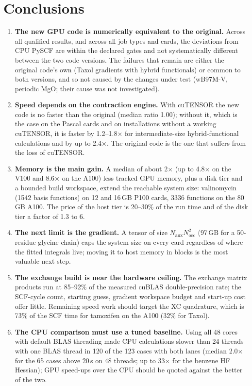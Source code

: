 \section{Conclusions}
\label{sec:conclusions}

\begin{enumerate}[itemsep=2pt]
\item \textbf{The new GPU code is numerically equivalent to the original.} Across all qualified results, and across all job types and cards, the deviations from CPU PySCF are within the declared gates and not systematically different between the two code versions. The failures that remain are either the original code's own (Taxol gradients with hybrid functionals) or common to both versions, and so not caused by the changes under test (wB97M-V, periodic MgO; their cause was not investigated).
\item \textbf{Speed depends on the contraction engine.} With cuTENSOR the new code is no faster than the original (median ratio 1.00); without it, which is the case on the Pascal cards and on installations without a working cuTENSOR, it is faster by 1.2--1.8$\times$ for intermediate-size hybrid-functional calculations and by up to 2.4$\times$. The original code is the one that suffers from the loss of cuTENSOR.
\item \textbf{Memory is the main gain.} A median of about 2$\times$ (up to 4.8$\times$ on the V100 and 8.6$\times$ on the A100) less tracked GPU memory, plus a disk tier and a bounded build workspace, extend the reachable system size: valinomycin (1542 basis functions) on 12 and 16\,GB P100 cards, 3336 functions on the 80\,GB A100. The price of the host tier is 20--30\% of the run time and of the disk tier a factor of 1.3 to 6.
\item \textbf{The next limit is the gradient.} A tensor of size $N_\mathrm{aux}N_\mathrm{occ}^2$ (97\,GB for a 50-residue glycine chain) caps the system size on every card regardless of where the fitted integrals live; moving it to host memory in blocks is the most valuable next step.
\item \textbf{The exchange build is near the hardware ceiling.} The exchange matrix products run at 85--92\% of the measured cuBLAS double-precision rate; the SCF-cycle count, starting guess, gradient workspace budget and start-up cost offer little. Remaining speed work should target the XC quadrature, which is 73\% of the SCF time for tamoxifen on the A100 (32\% for Taxol).
\item \textbf{The CPU comparison must use a tuned baseline.} Using all 48 cores with default BLAS threading made CPU calculations slower than 24 threads with one BLAS thread in 120 of the 123 cases with both lanes (median 2.0$\times$ for the 65 cases above 20\,s on 48 threads; up to 33$\times$ for the benzene HF Hessian); GPU speed-ups over the CPU should be quoted against the better of the two.
\end{enumerate}
